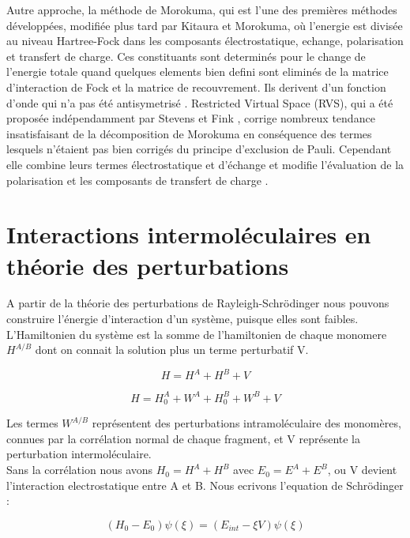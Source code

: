 Autre approche, la méthode de Morokuma, qui est l’une des premières méthodes développées, modifiée plus tard par Kitaura et Morokuma, où l'energie est divisée au niveau Hartree-Fock dans les composants  électrostatique, echange, polarisation et transfert de charge. Ces constituants sont determinés pour le change de l'energie totale quand quelques elements bien defini sont eliminés de la matrice d'interaction de Fock et la matrice de recouvrement. Ils derivent d'un fonction d'onde  qui n'a pas été antisymetrisé \cite{morokuma1977molecules}. Restricted Virtual Space (RVS), qui a été proposée indépendamment par Stevens et Fink \cite{stevens1987frozen}, corrige nombreux tendance insatisfaisant de la décomposition de Morokuma en conséquence des termes lesquels n’étaient pas bien corrigés du principe d’exclusion de Pauli. Cependant elle combine leurs termes électrostatique et d’échange et modifie l’évaluation de la polarisation et les composants de transfert de charge \cite{chen1996energy}.

\singlespacing
\section{Interactions intermoléculaires en théorie des perturbations}

A partir de la théorie des perturbations de Rayleigh-Schr\"{o}dinger nous pouvons construire l'énergie d'interaction d'un système, puisque elles sont faibles. L'Hamiltonien du système est la somme de l'hamiltonien de chaque monomere $H^{A/B}$ dont on connait la solution plus un terme perturbatif V. 

\begin{equation}
H = H^{A} + H^{B} + V
\end{equation}

\begin{equation}
H = H_{0}^{A} + W^{A} + H_{0}^{B} + W^{B} + V
\end{equation}

Les termes $W^{A/B}$ représentent des perturbations intramoléculaire des monomères, connues par la corrélation normal de chaque fragment, et V représente la perturbation intermoléculaire.\\

Sans la corrélation nous avons $H_{0} = H^{A} + H^{B}$ avec $E_{0} = E^{A} + E^{B}$, ou V devient l'interaction electrostatique entre A et B. Nous ecrivons l'equation de Schr\"{o}dinger :

\begin{equation}
(H_{0} - E_{0}) \psi (\xi) = (E_{int} - \xi V) \psi (\xi)
\end{equation}


